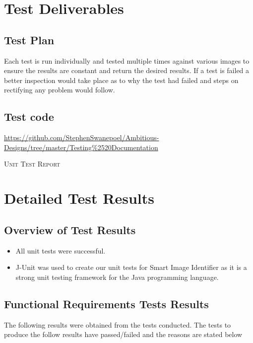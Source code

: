 \documentclass[a4paper,12pt]{report}
\begin{document}
\section{Test Deliverables}
	\subsection {Test Plan}
		Each test is run individually and tested multiple times against various images to ensure the results are constant and return the desired results. If a test is failed a better inspection would take place as to why the test had failed and steps on rectifying any problem would follow.
		
	\subsection {Test code}
		\href{url}{https://github.com/StephenSwanepoel/Ambitious-Designs/tree/master/Testing\%2520Documentation}  
	
\newpage
\begin{center}
	\textsc{\LARGE Unit Test Report}\\[1.5cm]
\end{center}
	\section{Detailed Test Results}
	\subsection{Overview of Test Results}
	\begin {itemize}
	\item All unit tests were successful.
	\item J-Unit was used to create our unit tests for Smart Image Identifier as it is a strong unit testing framework for the Java programming language.
	\end {itemize}

	\subsection{Functional Requirements Tests Results}
		The following results were obtained from the tests conducted. The tests to produce the follow results have passed/failed and the reasons are stated below
\end{document}
